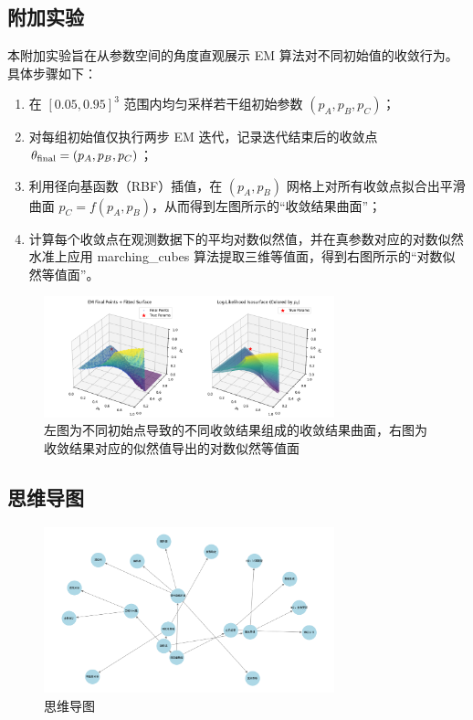 \subsection{附加实验}
本附加实验旨在从参数空间的角度直观展示 EM 算法对不同初始值的收敛行为。具体步骤如下：

\begin{enumerate}
  \item 在 $[0.05,0.95]^3$ 范围内均匀采样若干组初始参数 $(p_A,p_B,p_C)$；
  \item 对每组初始值仅执行两步 EM 迭代，记录迭代结束后的收敛点 $\theta_{\rm final}=(p_A,p_B,p_C)$；
  \item 利用径向基函数（RBF）插值，在 $(p_A,p_B)$ 网格上对所有收敛点拟合出平滑曲面 $p_C=f(p_A,p_B)$，从而得到左图所示的“收敛结果曲面”；
  \item 计算每个收敛点在观测数据下的平均对数似然值，并在真参数对应的对数似然水准上应用 marching\_cubes 算法提取三维等值面，得到右图所示的“对数似然等值面”。
\end{enumerate}
\begin{figure}[H]
  \centering
  \includegraphics[width=0.75\textwidth]{../images/sur.png}
  \caption{左图为不同初始点导致的不同收敛结果组成的收敛结果曲面，右图为收敛结果对应的似然值导出的对数似然等值面}
  \label{fig:sur}
\end{figure}

\subsection{思维导图}
\begin{figure}[H]
  \centering
  \includegraphics[width=0.75\textwidth]{../images/mind.png}
  \caption{思维导图}
  \label{fig:mind}
\end{figure}